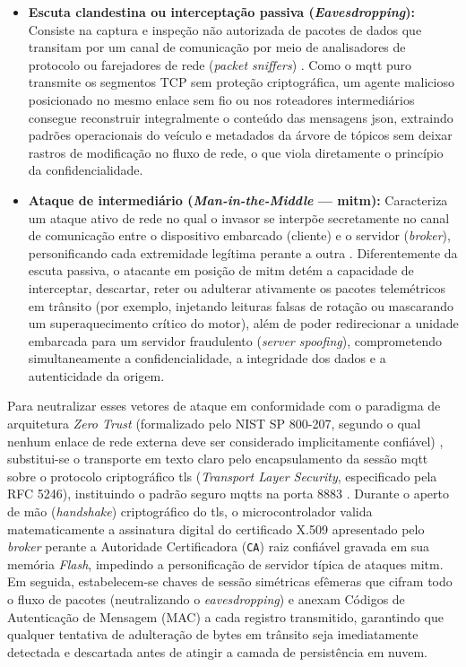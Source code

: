 \documentclass[
	12pt,				%
	openright,			%
	twoside,			%
	a4paper,			%
	english,			%
	brazil				%
	]{abntex2}
\begin{document}
\begin{itemize}
    \item \textbf{Escuta clandestina ou interceptação passiva (\textit{Eavesdropping}):}
        Consiste na captura e inspeção não autorizada de pacotes de dados que transitam
        por um canal de comunicação por meio de analisadores de protocolo ou farejadores
        de rede (\textit{packet sniffers}) \cite{kurose2010,eleuterio2011}. Como o
        \acrshort{mqtt} puro transmite os segmentos TCP sem proteção criptográfica, um
        agente malicioso posicionado no mesmo enlace sem fio ou nos roteadores
        intermediários consegue reconstruir integralmente o conteúdo das mensagens
        \acrshort{json}, extraindo padrões operacionais do veículo e metadados da árvore
        de tópicos sem deixar rastros de modificação no fluxo de rede, o que viola
        diretamente o princípio da confidencialidade.
    \item \textbf{Ataque de intermediário (\textit{Man-in-the-Middle} ---
        \acrshort{mitm}):} Caracteriza um ataque ativo de rede no qual o invasor se
        interpõe secretamente no canal de comunicação entre o dispositivo embarcado
        (cliente) e o servidor (\textit{broker}), personificando cada extremidade
        legítima perante a outra \cite{baars2018,tanenbaum2011}. Diferentemente da
        escuta passiva, o atacante em posição de \acrshort{mitm} detém a capacidade de
        interceptar, descartar, reter ou adulterar ativamente os pacotes telemétricos em
        trânsito (por exemplo, injetando leituras falsas de rotação ou mascarando um
        superaquecimento crítico do motor), além de poder redirecionar a unidade
        embarcada para um servidor fraudulento (\textit{server spoofing}),
        comprometendo simultaneamente a confidencialidade, a integridade dos dados e a
        autenticidade da origem.
\end{itemize}

Para neutralizar esses vetores de ataque em conformidade com o paradigma de arquitetura
\textit{Zero Trust} (formalizado pelo NIST SP 800-207, segundo o qual nenhum enlace de
rede externa deve ser considerado implicitamente confiável) \cite{rose2020},
substitui-se o transporte em texto claro pelo encapsulamento da sessão \acrshort{mqtt}
sobre o protocolo criptográfico \acrshort{tls} (\textit{Transport Layer Security},
especificado pela RFC 5246), instituindo o padrão seguro \acrshort{mqtts} na porta 8883
\cite{dierks2008}. Durante o aperto de mão (\textit{handshake}) criptográfico do
\acrshort{tls}, o microcontrolador valida matematicamente a assinatura digital do
certificado X.509 apresentado pelo \textit{broker} perante a Autoridade Certificadora
(\texttt{CA}) raiz confiável gravada em sua memória \textit{Flash}, impedindo a
personificação de servidor típica de ataques \acrshort{mitm}. Em seguida,
estabelecem-se chaves de sessão simétricas efêmeras que cifram todo o fluxo de pacotes
(neutralizando o \textit{eavesdropping}) e anexam Códigos de Autenticação de Mensagem
(MAC) a cada registro transmitido, garantindo que qualquer tentativa de adulteração de
bytes em trânsito seja imediatamente detectada e descartada antes de atingir a camada de
persistência em nuvem.
\end{document}
